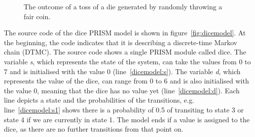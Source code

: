 \documentclass[
a4paper,
12pt
]{scrartcl}
\begin{document}
\begin{figure}[ht!]
  \centering
{}
  \caption{The outcome of a toss of a die generated by randomly throwing a fair coin.}\label{fig:dice}
\end{figure}

The source code of the dice PRISM model is shown in figure~\ref{fig:dicemodel}. At the beginning, the code indicates that it is describing a discrete-time Markov chain (DTMC). The source code shows a single PRISM module called dice. The variable \textit{s}, which represents the state of the system, can take the values from 0 to 7 and is initialised with the value 0 (line~\ref{dicemodel:s}). The variable \textit{d}, which represents the value of the dice, can range from 0 to 6 and is also initialised with the value 0, meaning that the dice has no value yet (line~\ref{dicemodel:d}).
Each line depicts a state and the probabilities of the transitions, e.g. line~\ref{dicemodel:s1} shows there is a probability of 0.5 of transiting to state 3 or state 4 if we are currently in state 1. The model ends if a value is assigned to the dice, as there are no further transitions from that point on.
\end{document}
